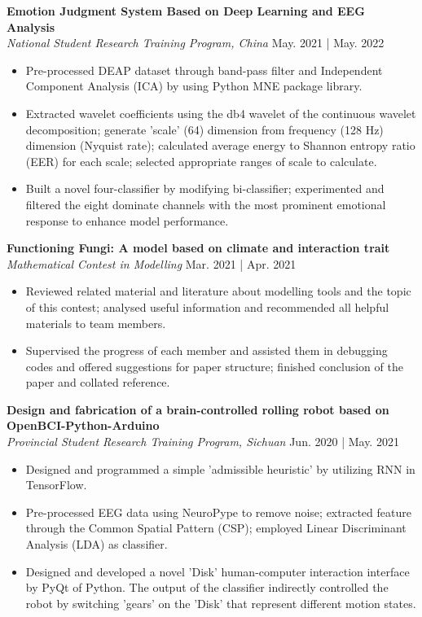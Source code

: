 \documentclass[a4paper,9pt]{extarticle}
\begin{document}
\noindent
\textbf{Emotion Judgment System Based on Deep Learning and EEG Analysis} \\ %
\textit{National Student Research Training Program, China} \hfill May. 2021 | May. 2022 %
\begin{itemize}
    \item Pre-processed DEAP dataset through band-pass filter and Independent Component Analysis (ICA) by using Python MNE package library.
    \item Extracted wavelet coefficients using the db4 wavelet of the continuous wavelet decomposition; generate 'scale' (64) dimension from frequency (128 Hz) dimension (Nyquist rate); calculated average energy to Shannon entropy ratio (EER) for each scale; selected appropriate ranges of scale to calculate.
    \item Built a novel four-classifier by modifying bi-classifier; experimented and filtered the eight dominate channels with the most prominent emotional response to enhance model performance.
\end{itemize}

\newpage
\noindent
\textbf{Functioning Fungi: A model based on climate and interaction trait} \\ %
\textit{Mathematical Contest in Modelling} \hfill Mar. 2021 | Apr. 2021\\
\begin{itemize}
    \item Reviewed related material and literature about modelling tools and the topic of this contest; analysed useful information and recommended all helpful materials to team members.
    \item Supervised the progress of each member and assisted them in debugging codes and offered suggestions for paper structure; finished conclusion of the paper and collated reference.
\end{itemize}

\noindent
\textbf{Design and fabrication of a brain-controlled rolling robot based on OpenBCI-Python-Arduino} \\ %
\textit{Provincial Student Research Training Program, Sichuan} \hfill Jun. 2020 | May. 2021 %
\begin{itemize}
    \item Designed and programmed a simple 'admissible heuristic' by utilizing RNN in TensorFlow.
    \item Pre-processed EEG data using NeuroPype to remove noise; extracted feature through the Common Spatial Pattern (CSP); employed Linear Discriminant Analysis (LDA) as classifier.
    \item Designed and developed a novel 'Disk' human-computer interaction interface by PyQt of Python. The output of the classifier indirectly controlled the robot by switching 'gears' on the 'Disk' that represent different motion states.
\end{itemize}
\end{document}
